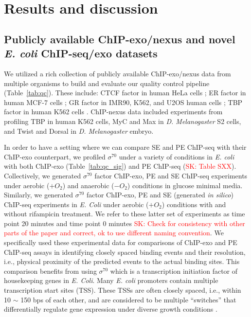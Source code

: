 \documentclass{bmcart}
\newcommand{\SK}[1]{\textcolor{red}{SK: #1}}
\newcommand{\sig}{\sigma^{70}}
\begin{document}
\section*{Results and discussion}
\label{sec:results}

\subsection*{Publicly available ChIP-exo/nexus and novel \textit{E. coli} ChIP-seq/exo datasets}
We utilized a rich collection of publicly available ChIP-exo/nexus data from multiple organisms to build and evaluate our quality control pipeline (Table~\ref{tab:qc}). These include:   CTCF factor
in human HeLa cells \cite{exo1}; ER factor in human MCF-7
cells \cite{exoillumina}; GR factor in IMR90, K562, and U2OS human
cells \cite{starick15}; TBP factor in human K562 cells
\cite{venters13}. 
ChIP-nexus data included experiments from \cite{chipnexus} profiling
TBP in human K562 cells, MyC and Max in \emph{D. Melanogaster} S2 cells, and Twist and
Dorsal in \emph{D. Melanogaster} embryo.

In order to have a setting where we can compare SE and PE ChIP-seq with their ChIP-exo counterpart, we profiled 
$\sig$ under a variety of  conditions in \textit{E. coli} with both ChIP-exo (Table~\ref{tab:qc_sig}) and PE ChIP-seq (\SK{Table SXX}). Collectively, we 
 generated $\sig$ factor ChIP-exo, PE and SE ChIP-seq experiments  under aerobic ($+O_2$) and anaerobic ($-O_2$)
conditions in glucose minimal media. Similarly, we generated $\sig$ factor ChIP-exo, PE and
SE (generated \emph{in silico}) ChIP-seq experiments in \emph{E. Coli}
under aerobic ($+O_2$) conditions with  and without  rifampicin  treatment.
We refer to these latter set of experiments  as time point 20 minutes and time point 0 minutes \SK{Check for consistency with other parts of the paper and correct, ok to use different naming convention}.
We specifically used these experimental data  for comparisons of ChIP-exo and PE
ChIP-seq assays in identifying closely spaced binding events and their resolution, i.e., physical proximity of the predicted events to the actual binding sites.  This comparison benefits from using $\sig$  which is a transcription initiation factor of housekeeping genes
in \emph{E. Coli}. Many \textit{E. coli} promoters contain
multiple transcription start sites (TSS). These TSSs are often
closely spaced, i.e., within 10 $\sim$ 150 bps of each other, and are considered  to be multiple ``switches'' that differentially
regulate gene expression under diverse growth conditions
\cite{regulondb}.
\end{document}
